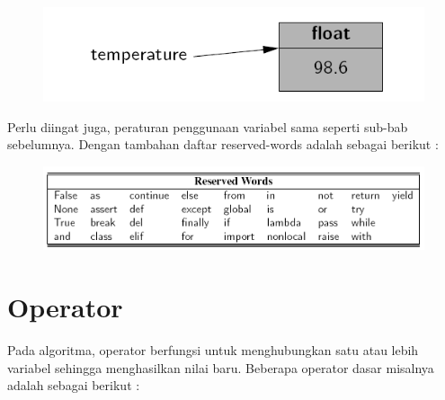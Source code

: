 \begin{figure}
		\centering
		\includegraphics[scale=0.5]{fig/1/Gambar16a.png}	
		\end{figure}

Perlu diingat juga, peraturan penggunaan variabel sama seperti sub-bab sebelumnya.  Dengan tambahan daftar reserved-words adalah sebagai berikut : 
		\begin{figure}
		\centering
		\includegraphics[scale=0.4]{fig/1/Gambar17.png}	
		\end{figure}



\section{Operator}
Pada algoritma, operator berfungsi untuk menghubungkan satu atau lebih variabel sehingga menghasilkan nilai baru. Beberapa operator dasar misalnya adalah sebagai berikut : 

